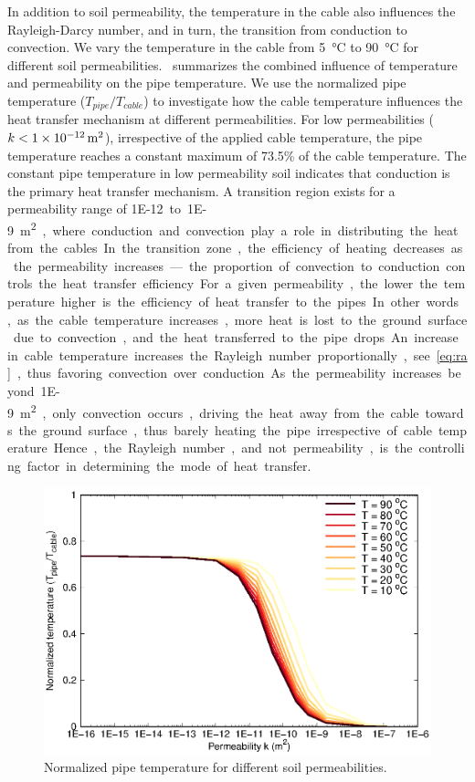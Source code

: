 \documentclass[Journal,letterpaper,InsideFigs]{ascelike-new}
\begin{document}
In addition to soil permeability, the temperature in the cable also influences the Rayleigh-Darcy number, and in turn, the transition from conduction to convection. We vary the temperature in the cable from \SI{5}{\celsius} to \SI{90}{\celsius} for different soil permeabilities.~ summarizes the combined influence of temperature and permeability on the pipe temperature. We use the normalized pipe temperature ($T_{pipe}/T_{cable}$) to investigate how the cable temperature influences the heat transfer mechanism at different permeabilities. For low permeabilities ($k < \SI{1E-12}{\meter\squared}$), irrespective of the applied cable temperature, the pipe temperature reaches a constant maximum of 73.5\% of the cable temperature. The constant pipe temperature in low permeability soil indicates that conduction is the primary heat transfer mechanism. A transition region exists for a permeability range of \SI{1E-12} to \SI{1E-9}{\meter\squared}, where conduction and convection play a role in distributing the heat from the cables. In the transition zone, the efficiency of heating decreases as the permeability increases—the proportion of convection to conduction controls the heat transfer efficiency. For a given permeability, the lower the temperature higher is the efficiency of heat transfer to the pipes. In other words, as the cable temperature increases, more heat is lost to the ground surface due to convection, and the heat transferred to the pipe drops. An increase in cable temperature increases the Rayleigh number proportionally, see~\cref{eq:ra}, thus favoring convection over conduction. As the permeability increases beyond \SI{1E-9}{\meter\squared}, only convection occurs, driving the heat away from the cable towards the ground surface, thus barely heating the pipe irrespective of cable temperature. Hence, the Rayleigh number, and not permeability, is the controlling factor in determining the mode of heat transfer.

\begin{figure}
    \centering
    \includegraphics{figs/k-dt.eps}
    \caption{Normalized pipe temperature for different soil permeabilities.}
    \label{fig:k-temp}
\end{figure}
\end{document}
